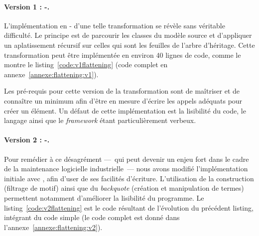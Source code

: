 \paragraph{Version 1 : {\java-\emf}.}
L'implémentation en {\java}-{\emf} d'une telle transformation se révèle sans
véritable difficulté. Le principe est de parcourir les classes du modèle source
et d'appliquer un aplatissement récursif sur celles qui sont les feuilles de
l'arbre d'héritage. Cette transformation peut être implémentée en environ 40
lignes de code, comme le montre le listing~\ref{code:v1flattening} (code
complet en annexe~\ref{annexe:flattening:v1}).

\begin{figure}[h]
  \begin{center}
    
  \end{center}
\end{figure}

Les pré-requis pour cette version de la transformation sont de maîtriser
{\java} et de connaître un minimum {\emf} afin d'être en mesure d'écrire les
appels adéquats pour créer un élément. Un défaut de cette implémentation est la
lisibilité du code, le langage {\java} ainsi que le \emph{framework} {\emf}
étant particulièrement verbeux. 


\paragraph{Version 2 : {\tomjava-\emf}.}

Pour remédier à ce désagrément ---~qui peut devenir un enjeu fort dans le cadre
de la maintenance logicielle industrielle~--- nous avons modifié
l'implémentation initiale avec {\tom}, afin d'user de ses facilités d'écriture.
L'utilisation de la construction  (filtrage de motif) ainsi que du
\emph{backquote} (création et manipulation de termes) permettent notamment
d'améliorer la lisibilité du programme. Le listing~\ref{code:v2flattening} est
le code résultant de l'évolution du précédent listing, intégrant du code {\tom}
simple (le code complet est donné dans l'annexe~\ref{annexe:flattening:v2}).


\begin{figure}[h]
  \begin{center}
    
  \end{center}
\end{figure}

